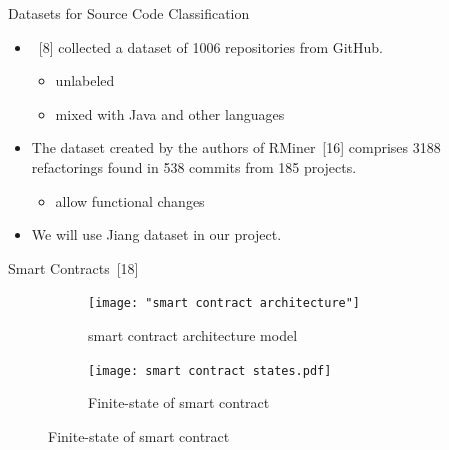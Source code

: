 \documentclass[xcolor=svgnames]{beamer}
\begin{document}
\begin{frame}{Datasets for Source Code Classification}
\begin{itemize}
\item {}~[8] collected a dataset of \num{1006} repositories from GitHub.
\begin{itemize}
\item unlabeled
\item mixed with Java and other languages
\end{itemize}

\item The dataset created by the authors of RMiner~[16] comprises \num{3188} refactorings found in 538 commits from 185 projects.
\begin{itemize}
\item allow functional changes
\end{itemize}

\item We will use Jiang dataset in our project.
\end{itemize}

\end{frame}



\begin{frame}{Smart Contracts~[18]}

\begin{figure}
\centering
\begin{subfigure}[T]{0.3\textwidth}
	\texttt{[image: "smart contract architecture"]}
	\caption{smart contract architecture model}
\end{subfigure}
\hfill
\begin{subfigure}[T]{0.65\textwidth}
	\texttt{[image: smart contract states.pdf]}
	\caption{Finite-state of smart contract}
\end{subfigure}
\end{figure}


\end{frame}


\end{document}
